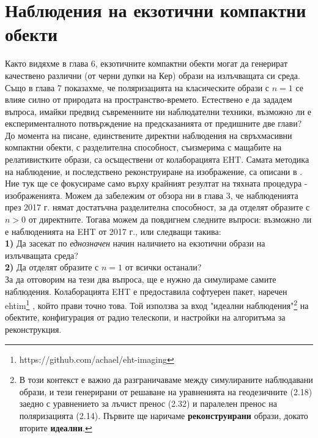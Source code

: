 \section{Наблюдения на екзотични компактни обекти}
Както видяхме в глава 6, екзотичните компактни обекти могат да генерират качествено различни (от черни дупки на Кер) образи на излъчващата си среда. Също в глава 7 показахме, че поляризацията на класическите образи с $n = 1$ се влияе силно от природата на пространство-времето. Естествено е да зададем въпроса, имайки предвид съвременните ни наблюдателни техники, възможно ли е експерименталното потвърждение на предсказанията от предишните две глави?\\

До момента на писане, единствените директни наблюдения на свръхмасивни компактни обекти, с разделителна способност, съизмерима с мащабите на релативистките образи, са осъществени от колаборацията EHT. Самата методика на наблюдение, и последствено реконструиране на изображение, са описани в \cite{EHT_M87_II}\cite{EHT_M87_III}. Ние тук ще се фокусираме само върху крайният резултат на тяхната процедура - изображенията. Можем да забележим от обзора ни в глава 3, че наблюденията през 2017 г. нямат достатъчна разделителна способност, за да отделят образите с $n > 0 $ от директните. Тогава можем да повдигнем следните въпроси: възможно ли е наблюденията на EHT от 2017 г., или следващи такива:\\

\textbf{1)} Да засекат по \emph{еднозначен} начин наличието на екзотични образи на излъчващата среда?\\

\textbf{2)} Да отделят образите с $n = 1$ от всички останали?\\

За да отговорим на тези два въпроса, ще е нужно да симулираме самите наблюдения. Колаборацията EHT е предоставила софтуерен пакет, наречен ehtim\footnote{https://github.com/achael/eht-imaging} \cite{EHTIM}, който прави точно това. Той използва за вход "идеални наблюдения"\footnote{В този контекст е важно да разграничаваме между симулираните наблюдавани образи, и тези генерирани от решаване на уравненията на геодезичните (2.18) заедно с уравнението за лъчист пренос (2.32) и паралелен пренос на поляризацията (2.14). Първите ще наричаме \textbf{реконструирани} образи, докато вторите \textbf{идеални}.} на обектите, конфигурация от радио телескопи, и настройки на алгоритъма за реконструкция. \\

